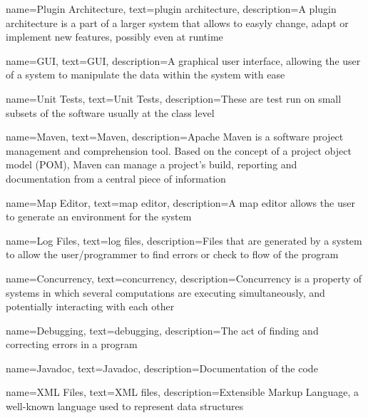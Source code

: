{
    name={Plugin Architecture},
    text={plugin architecture},
    description={A plugin architecture is a part of a larger system that allows to easyly change, adapt or implement new features, possibly even at runtime}
}

{
    name={GUI},
    text={GUI},
    description={A graphical user interface, allowing the user of a system to manipulate the data within the system with ease}
}

{
    name={Unit Tests},
    text={Unit Tests},
    description={These are test run on small subsets of the software usually at the class level}
}

{
    name={Maven},
    text={Maven},
    description={Apache Maven is a software project management and comprehension tool. Based on the concept of a project object model (POM), Maven can manage a project's build, reporting and documentation from a central piece of information}
}

{
    name={Map Editor},
    text={map editor},
    description={A map editor allows the user to generate an environment for the system}
}

{
    name={Log Files},
    text={log files},
    description={Files that are generated by a system to allow the user/programmer to find errors or check to flow of the program}
}

{
    name={Concurrency},
    text={concurrency},
    description={Concurrency is a property of systems in which several computations are executing simultaneously, and potentially interacting with each other}
}

{
    name={Debugging},
    text={debugging},
    description={The act of finding and correcting errors in a program}
}

{
    name={Javadoc},
    text={Javadoc},
    description={Documentation of the code}
}

{
    name={XML Files},
    text={XML files},
    description={Extensible Markup Language, a well-known language used to represent data structures}
}